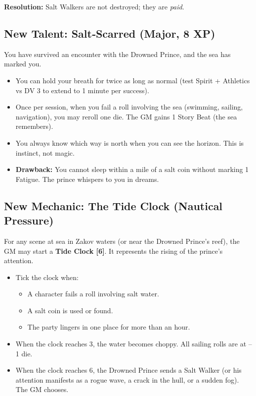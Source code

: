 \documentclass[12pt]{article}
\begin{document}
\textbf{Resolution:} Salt Walkers are not destroyed; they are \textit{paid}.

\subsection{New Talent: Salt‑Scarred (Major, 8 XP)}
You have survived an encounter with the Drowned Prince, and the sea has marked you.

\begin{itemize}
  \item You can hold your breath for twice as long as normal (test Spirit + Athletics vs DV 3 to extend to 1 minute per success).
  \item Once per session, when you fail a roll involving the sea (swimming, sailing, navigation), you may reroll one die. The GM gains 1 Story Beat (the sea remembers).
  \item You always know which way is north when you can see the horizon. This is instinct, not magic.
  \item \textbf{Drawback:} You cannot sleep within a mile of a salt coin without marking 1 Fatigue. The prince whispers to you in dreams.
\end{itemize}

\subsection{New Mechanic: The Tide Clock (Nautical Pressure)}
For any scene at sea in Zakov waters (or near the Drowned Prince’s reef), the GM may start a \textbf{Tide Clock [6]}. It represents the rising of the prince’s attention.

\begin{itemize}
  \item Tick the clock when:
    \begin{itemize}
      \item A character fails a roll involving salt water.
      \item A salt coin is used or found.
      \item The party lingers in one place for more than an hour.
    \end{itemize}
  \item When the clock reaches 3, the water becomes choppy. All sailing rolls are at –1 die.
  \item When the clock reaches 6, the Drowned Prince sends a Salt Walker (or his attention manifests as a rogue wave, a crack in the hull, or a sudden fog). The GM chooses.
\end{itemize}
\end{document}
